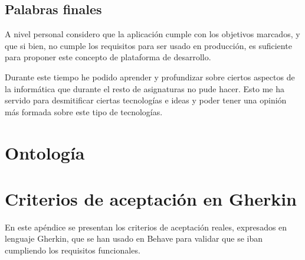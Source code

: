 \documentclass[openright,twoside,12pt]{book}
\begin{document}
\section{Palabras finales}

A nivel personal considero que la aplicación cumple con los objetivos marcados, y que si bien, no cumple los requisitos para ser usado en producción, es suficiente para proponer este concepto de plataforma de desarrollo.

Durante este tiempo he podido aprender y profundizar sobre ciertos aspectos de la informática que durante el resto de asignaturas no pude hacer. Esto me ha servido para desmitificar ciertas tecnologías e ideas y poder tener una opinión más formada sobre este tipo de tecnologías.


\begin{appendices}
\chapter{Ontología}

\chapter{Criterios de aceptación en Gherkin}
En este apéndice se presentan los criterios de aceptación reales, expresados en lenguaje Gherkin, que se han usado en Behave para validar que se iban cumpliendo los requisitos funcionales.





\end{appendices}

\clearpage
{}

\end{document}
